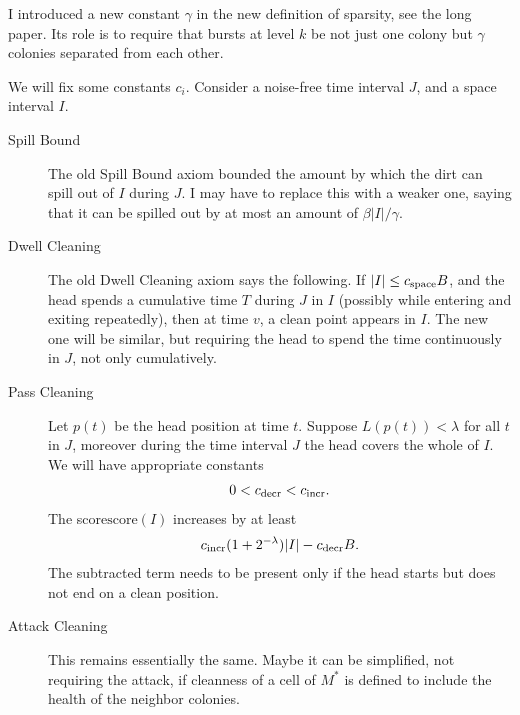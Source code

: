 \documentclass[12pt]{memoir}
\renewcommand{\le}{\leq}
\renewcommand{\ge}{\geq}
\def\B{B}
\newcommand{\score}{\mathrm{score}}
\newcommand{\Tu}{T}
\newcommand{\cns}[1]{c_{\textrm{\upshape #1}}}
\newcommand{\cSpace}{\cns{space}}
\newcommand{\cDecr}{\cns{decr}}
\newcommand{\cIncr}{\cns{incr}}
\begin{document}
I introduced a new constant \( \gamma \) 
in the new definition of sparsity, see the long paper.
Its role is to require that bursts at level \( k \) be
not just one colony but \( \gamma \) colonies separated from each other.


We will fix some  constants \( c_{i} \).
Consider a noise-free time interval \( J \), and a space interval \( I \).

\begin{description}
\item[Spill Bound] 
The old Spill Bound axiom bounded the amount by which the dirt can spill out
of \( I \) during \( J \).
I may have to replace this with a weaker one, saying
that it can be spilled out by at most an amount of \( \beta |I|/\gamma \).

\item[Dwell Cleaning]
The old Dwell Cleaning axiom says the following.
If \( |I| \le \cSpace\B \), and the head spends a cumulative time  \( \Tu \)  during \( J \)
in \( I \) (possibly while entering and exiting repeatedly),
then at time \( v \), a clean point appears in \( I \).
The new one will be similar, but requiring the head to spend the time continuously in \( J \),
not only cumulatively.


\item[Pass Cleaning]
Let \( p(t) \) be the head position at time \( t \).
Suppose \( L(p(t))<\lambda \) for all \( t \) in \( J \), moreover
during the time interval \( J \) the head covers the whole of \( I \).
We will have appropriate constants 
\begin{align*}
   0<\cDecr<\cIncr.
 \end{align*}
The score\( \score(I) \) increases by at least 
\begin{align*}
 \cIncr(1+2^{-\lambda})|I|-\cDecr\B .
 \end{align*}
The subtracted term needs to be present only if the head starts but does not end
on a clean position.

\item[Attack Cleaning]
This remains essentially the same.
Maybe it can be  simplified, not requiring the attack, if cleanness of a cell of \( M^{*} \) is
defined to include the health of the neighbor colonies.
\end{description}
\end{document}

